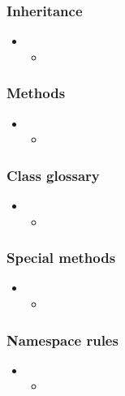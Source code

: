 \begin{frame}[fragile]
%
  \frametitle{Inheritance}
%
  \begin{itemize}
%
  \item 
    \begin{itemize}
    \item
    \end{itemize}
%
  \end{itemize}
%
\end{frame}

\begin{frame}[fragile]
%
  \frametitle{Methods}
%
  \begin{itemize}
%
  \item 
    \begin{itemize}
    \item
    \end{itemize}
%
  \end{itemize}
%
\end{frame}

\begin{frame}[fragile]
%
  \frametitle{Class glossary}
%
  \begin{itemize}
%
  \item 
    \begin{itemize}
    \item
    \end{itemize}
%
  \end{itemize}
%
\end{frame}

\begin{frame}[fragile]
%
  \frametitle{Special methods}
%
  \begin{itemize}
%
  \item 
    \begin{itemize}
    \item
    \end{itemize}
%
  \end{itemize}
%
\end{frame}

\begin{frame}[fragile]
%
  \frametitle{Namespace rules}
%
  \begin{itemize}
%
  \item 
    \begin{itemize}
    \item
    \end{itemize}
%
  \end{itemize}
%
\end{frame}

